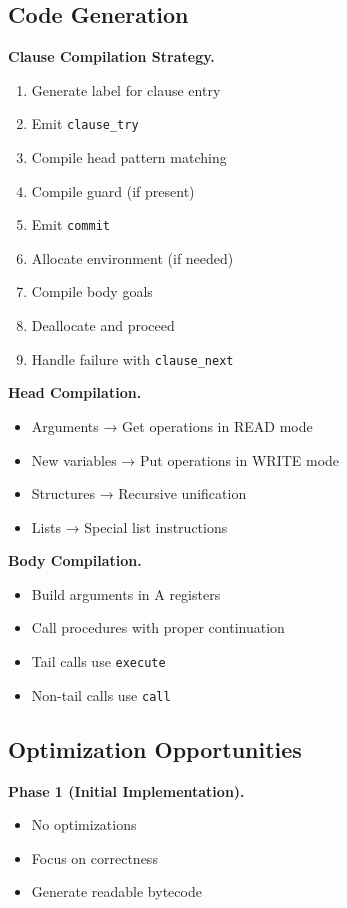 \documentclass[runningheads,thm-restate]{llncs}
\newcommand{\mypara}[1]{\smallskip\noindent\textbf{#1.}}
\begin{document}
\subsection{Code Generation}

\mypara{Clause Compilation Strategy}
\begin{enumerate}
\item Generate label for clause entry
\item Emit \texttt{clause\_try}
\item Compile head pattern matching
\item Compile guard (if present)
\item Emit \texttt{commit}
\item Allocate environment (if needed)
\item Compile body goals
\item Deallocate and proceed
\item Handle failure with \texttt{clause\_next}
\end{enumerate}

\mypara{Head Compilation}
\begin{itemize}
\item Arguments → Get operations in READ mode
\item New variables → Put operations in WRITE mode
\item Structures → Recursive unification
\item Lists → Special list instructions
\end{itemize}

\mypara{Body Compilation}
\begin{itemize}
\item Build arguments in A registers
\item Call procedures with proper continuation
\item Tail calls use \texttt{execute}
\item Non-tail calls use \texttt{call}
\end{itemize}

\subsection{Optimization Opportunities}

\mypara{Phase 1 (Initial Implementation)}
\begin{itemize}
\item No optimizations
\item Focus on correctness
\item Generate readable bytecode
\end{itemize}
\end{document}
